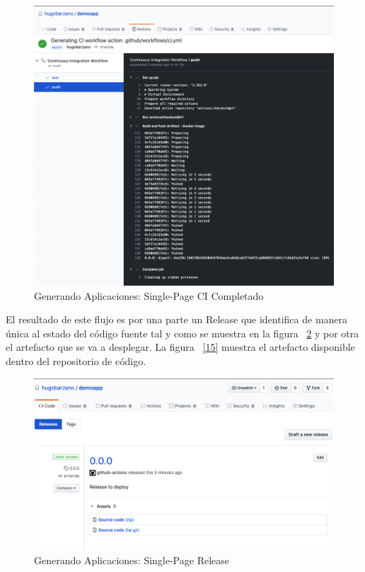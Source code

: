 \documentclass[a4paper,11pt]{book}
\begin{document}
\begin{figure}[H]
\centering
\includegraphics[scale=0.45]{imagenes/casouso_a/13.png}
\caption{ Generando Aplicaciones: Single-Page CI Completado  }
\label{13}
\end{figure}

El resultado de este flujo es por una parte un Release que identifica de manera única al estado del código fuente tal y como se muestra en la figura ~\ref{14} y por otra el artefacto que se va a desplegar. La figura ~\ref{15} muestra el artefacto disponible dentro del repositorio de código.  

\begin{figure}[H]
\centering
\includegraphics[scale=0.35]{imagenes/casouso_a/14.png}
\caption{ Generando Aplicaciones: Single-Page Release  }
\label{14}
\end{figure}
\end{document}
